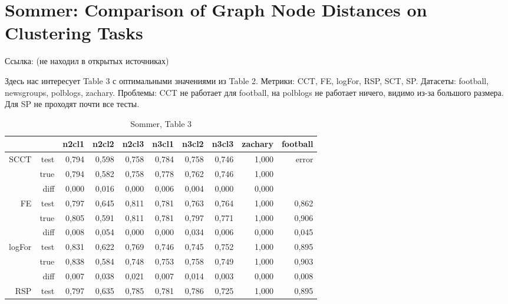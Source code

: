 \documentclass{article}
\begin{document}
\section{Sommer: Comparison of Graph Node Distances on Clustering Tasks}
Ссылка: (не находил в открытых источниках)

Здесь нас интересует Table 3 с оптимальными значениями из Table 2.
Метрики: CCT, FE, logFor, RSP, SCT, SP.
Датасеты: football, newsgroups, polblogs, zachary.
Проблемы: CCT не работает для football, на polblogs не работает ничего, видимо из-за большого размера. Для SP не проходят почти все тесты.

\begin{table}[H]
\centering
\caption{Sommer, Table 3}
\label{my-label}
\begin{tabular}{rr|rrrrrrrr}
       &      & n2cl1 & n2cl2 & n2cl3 & n3cl1 & n3cl2 & n3cl3 & zachary & football \\
       \hline
SCCT   & test & 0,794        & 0,598        & 0,758        & 0,784        & 0,758        & 0,746        & 1,000   & \cellcolor{red!25} error    \\
       & true & 0,794        & 0,582        & 0,758        & 0,778        & 0,762        & 0,746        & 1,000   &          \\
       & diff & 0,000        & 0,016        & 0,000        & 0,006        & 0,004        & 0,000        & 0,000   &          \\
       \cline{2-10}
FE     & test & 0,797        & 0,645        & 0,811        & 0,781        & 0,763        & 0,764        & 1,000   & 0,862    \\
       & true & 0,805        & 0,591        & 0,811        & 0,781        & 0,797        & 0,771        & 1,000   & 0,906    \\
       & diff & 0,008        & 0,054        & 0,000        & 0,000        & 0,034        & 0,006        & 0,000   & 0,045    \\
       \cline{2-10}
logFor & test & 0,831        & 0,622        & 0,769        & 0,746        & 0,745        & 0,752        & 1,000   & 0,895    \\
       & true & 0,838        & 0,584        & 0,748        & 0,753        & 0,758        & 0,749        & 1,000   & 0,903    \\
       & diff & 0,007        & 0,038        & 0,021        & 0,007        & 0,014        & 0,003        & 0,000   & 0,008    \\
       \cline{2-10}
RSP    & test & 0,797        & 0,635        & 0,785        & 0,781        & 0,786        & 0,725        & 1,000   & 0,895    \\

\end{tabular}
\end{table}
\end{document}

